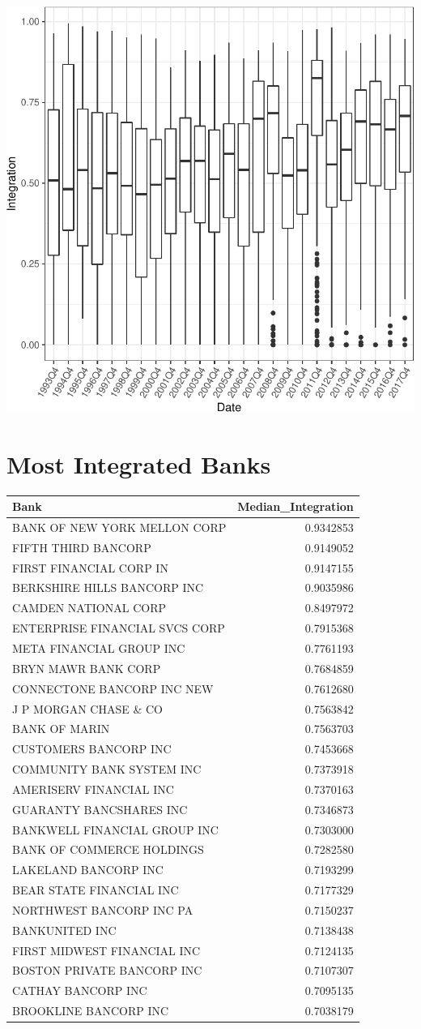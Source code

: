 \documentclass[11pt,]{article}
\begin{document}
\begin{center}\includegraphics{AC_US_Bank_Int_Results_1_files/figure-latex/emp_distr_US_bank_int-1} \end{center}

\section{Most Integrated Banks}\label{most-integrated-banks}

\begin{longtable}[]{@{}lr@{}}
\toprule
Bank & Median\_Integration\tabularnewline
\midrule
\endhead
BANK OF NEW YORK MELLON CORP & 0.9342853\tabularnewline
FIFTH THIRD BANCORP & 0.9149052\tabularnewline
FIRST FINANCIAL CORP IN & 0.9147155\tabularnewline
BERKSHIRE HILLS BANCORP INC & 0.9035986\tabularnewline
CAMDEN NATIONAL CORP & 0.8497972\tabularnewline
ENTERPRISE FINANCIAL SVCS CORP & 0.7915368\tabularnewline
META FINANCIAL GROUP INC & 0.7761193\tabularnewline
BRYN MAWR BANK CORP & 0.7684859\tabularnewline
CONNECTONE BANCORP INC NEW & 0.7612680\tabularnewline
J P MORGAN CHASE \& CO & 0.7563842\tabularnewline
BANK OF MARIN & 0.7563703\tabularnewline
CUSTOMERS BANCORP INC & 0.7453668\tabularnewline
COMMUNITY BANK SYSTEM INC & 0.7373918\tabularnewline
AMERISERV FINANCIAL INC & 0.7370163\tabularnewline
GUARANTY BANCSHARES INC & 0.7346873\tabularnewline
BANKWELL FINANCIAL GROUP INC & 0.7303000\tabularnewline
BANK OF COMMERCE HOLDINGS & 0.7282580\tabularnewline
LAKELAND BANCORP INC & 0.7193299\tabularnewline
BEAR STATE FINANCIAL INC & 0.7177329\tabularnewline
NORTHWEST BANCORP INC PA & 0.7150237\tabularnewline
BANKUNITED INC & 0.7138438\tabularnewline
FIRST MIDWEST FINANCIAL INC & 0.7124135\tabularnewline
BOSTON PRIVATE BANCORP INC & 0.7107307\tabularnewline
CATHAY BANCORP INC & 0.7095135\tabularnewline
BROOKLINE BANCORP INC & 0.7038179\tabularnewline
\bottomrule
\end{longtable}
\end{document}
